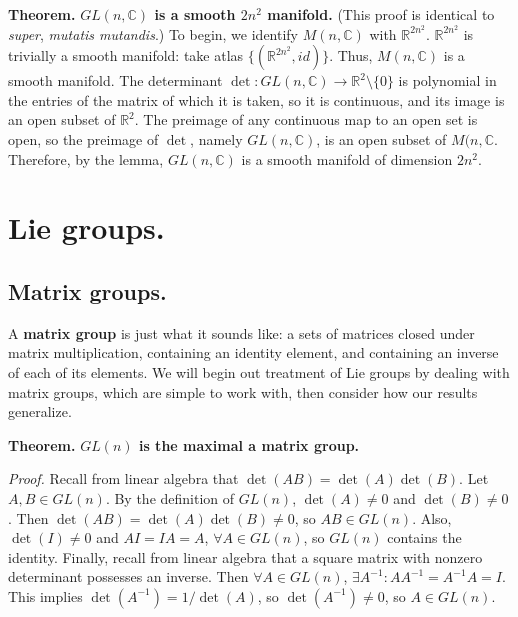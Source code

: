 \documentclass[12pt]{article}
\newcommand{\C}{\mathbb{C}}
\newcommand{\R}{\mathbb{R}}
\newenvironment{theorem}{\textbf{Theorem.}}{\vspace{6pt}}
\begin{document}
\begin{theorem}
    \textbf{$GL(n, \C)$ is a smooth $2n^2$
    manifold.} (This proof is identical to
    \textit{super}, \textit{mutatis mutandis}.) To
    begin, we identify $M(n, \C)$ with
    $\R^{2n^2}$. $\R^{2n^2}$ is trivially a smooth
    manifold: take atlas $\{(\R^{2n^2}, id)\}$.
    Thus, $M(n, \C)$ is a smooth manifold. The
    determinant $\det: GL(n, \C) \to \R^2 \setminus
    \{0\}$ is polynomial in the entries of the
    matrix of which it is taken, so it is
    continuous, and its image is an open subset of
    $\R^2$. The preimage of any continuous map to an
    open set is open, so the preimage of $\det$,
    namely $GL(n, \C)$, is an open subset of $M(n,
    \C$. Therefore, by the lemma, $GL(n, \C)$ is
    a smooth manifold of dimension $2n^2$.
\end{theorem}

\section{Lie groups.}

\subsection{Matrix groups.}
\par{A \textbf{matrix group} is just what it sounds
like: a sets of matrices closed under matrix
multiplication, containing an identity element,
and containing an inverse of each of its elements.
We will begin out treatment of Lie groups by
dealing with matrix groups, which are simple
to work with, then consider how our results
generalize.}

\begin{theorem}
    \textbf{$GL(n)$ is the maximal a matrix group.}
\end{theorem}

\par{\textit{Proof.} Recall from linear algebra
that $\det(AB) = \det(A)\det(B)$. Let $A, B \in
GL(n)$. By the definition of $GL(n)$, $\det(A) \neq
0$ and $\det(B) \neq 0$. Then $\det(AB) =
\det(A)\det(B) \neq 0$, so $AB \in GL(n)$. Also,
$\det(I) \neq 0$ and $AI = IA = A$, $\forall A \in
GL(n)$, so $GL(n)$ contains the identity.
Finally, recall from linear algebra that a square
matrix with nonzero determinant possesses an
inverse. Then $\forall A \in GL(n)$, $\exists
A^{-1}: AA^{-1} = A^{-1}A = I$. This implies
$\det(A^{-1}) = 1/ \det(A)$, so $\det(A^{-1}) \neq
0$, so $A \in GL(n)$.}
\end{document}
